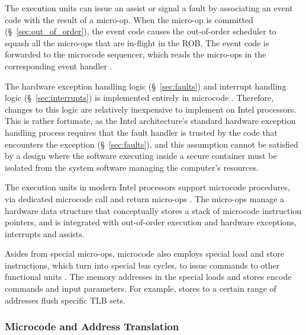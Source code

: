 The execution units can issue an assist or signal a fault by associating an
event code with the result of a micro-op. When the micro-op is committed
(\S~\ref{sec:out_of_order}), the event code causes the out-of-order scheduler
to squash all the micro-ops that are in-flight in the ROB. The event code is
forwarded to the microcode sequencer, which reads the micro-ops in the
corresponding event handler \cite{intel1997events, intel1999exceptions}.

The hardware exception handling logic (\S~\ref{sec:faults}) and interrupt
handling logic (\S~\ref{sec:interrupts}) is implemented entirely in microcode
\cite{intel1999exceptions}. Therefore, changes to this logic are relatively
inexpensive to implement on Intel processors. This is rather fortunate, as the
Intel architecture's standard hardware exception handling process requires that
the fault handler is trusted by the code that encounters the exception
(\S~\ref{sec:faults}), and this assumption cannot be satisfied by a design
where the software executing inside a secure container must be isolated from
the system software managing the computer's resources.


The execution units in modern Intel processors support microcode procedures,
via dedicated microcode call and return micro-ops \cite{intel2007microstack}.
The micro-ops manage a hardware data structure that conceptually stores a stack
of microcode instruction pointers, and is integrated with out-of-order
execution and hardware exceptions, interrupts and assists.


Asides from special micro-ops, microcode also employs special load and store
instructions, which turn into special bus cycles, to issue commands to other
functional units \cite{intel1997microspace}. The memory addresses in the
special loads and stores encode commands and input parameters. For example,
stores to a certain range of addresses flush specific TLB sets.


\subsubsection{Microcode and Address Translation}
\label{sec:microcode_pmh}

